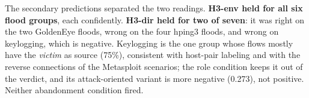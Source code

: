\documentclass[preprint,12pt]{elsarticle}
\begin{document}
The secondary predictions separated the two readings. \textbf{H3-env held for all six flood groups}, each confidently. \textbf{H3-dir held for two of seven}: it was right on the two GoldenEye floods, wrong on the four hping3 floods, and wrong on keylogging, which is negative. Keylogging is the one group whose flows mostly have the \emph{victim} as source (75\%), consistent with host-pair labeling and with the reverse connections of the Metasploit scenarios; the role condition keeps it out of the verdict, and its attack-oriented variant is more negative (0.273), not positive. Neither abandonment condition fired.

\end{document}
